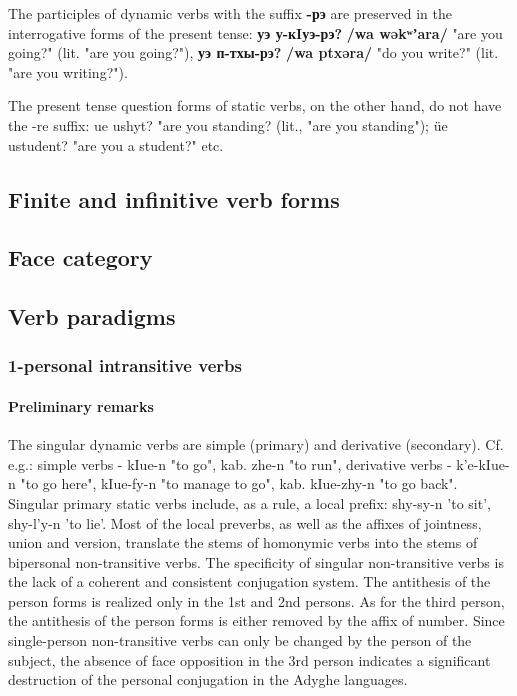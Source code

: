 \documentclass[a4paper,12pt]{book}
\newcommand{\1}[1]{\textbf{\emph{#1}}} %
\newcommand{\2}[1]{\textbf{[#1]}} %
\newcommand{\3}[1]{\fontsize{11pt}{0cm}\textbf{\emph{#1}}} %
\newcommand{\4}[1]{\fontsize{10pt}{0cm}\emph{#1}}	%
\newcommand{\5}[1]{\textbf{/#1/}} %
\newcommand{\6}[1]{\textbf{[#1]}} %
\newcommand{\7}[1]{\fontsize{12pt}{0cm}\emph{#1}} %
\newcommand{\8}[1]{\fontsize{12pt}{0cm}`#1'} %
\newcommand{\9}[1]{\fontsize{12pt}{0cm}(lit. `#1')} %
\newcommand{\glossphonemics}[1]{\textbf{/#1/}} %
\begin{document}
\begin{xlist}
The participles of dynamic verbs with the suffix \textbf{-рэ} are preserved in the interrogative forms of the present tense: \textbf{уэ у-кIуэ-рэ?} \glossphonemics{wa wəkʷʼara} "are you going?" (lit. "are you going?"), \textbf{уэ п-тхы-рэ?} \glossphonemics{wa ptxəra} "do you write?" (lit. "are you writing?").

The present tense question forms of static verbs, on the other hand, do not have the -re suffix: ue ushyt? "are you standing? (lit., "are you standing"); üe ustudent? "are you a student?" etc.
\end{xlist}

\subsection{Finite and infinitive verb forms}
\subsection{Face category}
\subsection{Verb paradigms}
\subsubsection{1-personal intransitive verbs}
\paragraph{Preliminary remarks}
The singular dynamic verbs are simple (primary) and derivative (secondary). Cf. e.g.: simple verbs - kIue-n "to go", kab. zhe-n "to run", derivative verbs - k'e-kIue-n "to go here", kIue-fy-n "to manage to go", kab. kIue-zhy-n "to go back".
Singular primary static verbs include, as a rule, a local prefix: shy-sy-n 'to sit', shy-l'y-n 'to lie'. Most of the local preverbs, as well as the affixes of jointness, union and version, translate the stems of homonymic verbs into the stems of bipersonal non-transitive verbs.
The specificity of singular non-transitive verbs is the lack of a coherent and consistent conjugation system. The antithesis of the person forms is realized only in the 1st and 2nd persons. As for the third person, the antithesis of the person forms is either removed by the affix of number. Since single-person non-transitive verbs can only be changed by the person of the subject, the absence of face opposition in the 3rd person indicates a significant destruction of the personal conjugation in the Adyghe languages.
\end{document}
